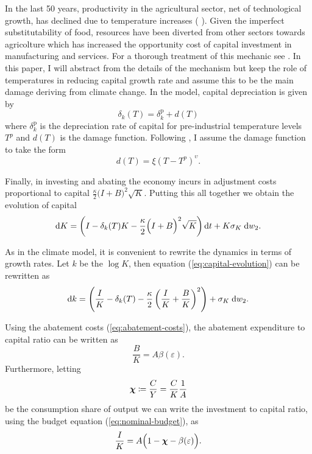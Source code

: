 \documentclass[../../main.tex]{subfiles}
\begin{document}
In the last 50 years, productivity in the agricultural sector, net of technological growth, has declined due to temperature increases (\citeauthor{dell_temperature_2009} \citeyear{dell_temperature_2009}). Given the imperfect substitutability of food, resources have been diverted from other sectors towards agricolture which has increased the opportunity cost of capital investment in manufacturing and services. For a thorough treatment of this mechanic see . In this paper, I will abstract from the details of the mechanism but keep the role of temperatures in reducing capital growth rate and assume this to be the main damage deriving from climate change. In the model, capital depreciation is given by \begin{equation}
    \delta_k(T) = \delta^{\mathrm{p}}_k +  d(T)
\end{equation} where $\delta^{\mathrm{p}}_k$ is the depreciation rate of capital for pre-industrial temperature levels $T^p$ and $d(T)$ is the damage function. Following , I assume the damage function to take the form \begin{equation}
    d(T) = \xi (T - T^p)^{\upsilon}.
\end{equation}

Finally, in investing and abating the economy incurs in adjustment costs proportional to capital $\frac{\kappa}{2} \big(I + B \big)^2 \sqrt{K}$. Putting this all together we obtain the evolution of capital \begin{equation} \label{eq:capital-evolution}
    \mathrm{d}K = \left( I - \delta_k(T) K - \frac{\kappa}{2} \Big(I + B\Big)^2 \sqrt{K} \right) \mathrm{d}t + K \sigma_K \; \mathrm{d}w_2.
\end{equation} 

As in the climate model, it is convenient to rewrite the dynamics in terms of growth rates. Let $k$ be the $\log K$, then equation (\ref{eq:capital-evolution}) can be rewritten as \begin{equation} \label{eq:capital-evolution:log:level}
    \text{d}k = \left( \frac{I}{K} - \delta_k(T) - \frac{\kappa}{2} \left(\frac{I}{K} + \frac{B}{K}\right)^2 \right) + \sigma_K \; \mathrm{d}w_2.
\end{equation}

Using the abatement costs (\ref{eq:abatement-costs}), the abatement expenditure to capital ratio can be written as \begin{equation}
    \frac{B}{K} = A \beta(\varepsilon).
\end{equation} Furthermore, letting \begin{equation}
    \bm{\chi} \coloneqq \frac{C}{Y} = \frac{C}{K} \frac{1}{A}
\end{equation} be the consumption share of output we can write the investment to capital ratio, using the budget equation (\ref{eq:nominal-budget}), as \begin{equation}
    \frac{I}{K} = A \Big(1 - \bm{\chi} - \beta(\varepsilon)\Big).
\end{equation}
\end{document}
